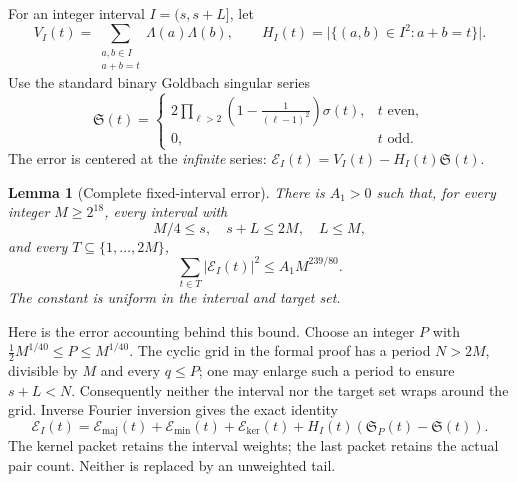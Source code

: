 \documentclass[11pt]{article}
\newtheorem{lemma}[theorem]{Lemma}
\theoremstyle{definition}
\theoremstyle{remark}
\newcommand{\sig}{\sigma}
\newcommand{\card}[1]{\lvert #1\rvert}
\begin{document}
For an integer interval \(I=(s,s+L]\), let
\[
 V_I(t)=\sum_{\substack{a,b\in I\\a+b=t}}\Lambda(a)\Lambda(b),
 \qquad
 H_I(t)=\card{\{(a,b)\in I^2:a+b=t\}}.
\]
Use the standard binary Goldbach singular series
\[
 \mathfrak S(t)=
 \begin{cases}
 2\displaystyle\prod_{\ell>2}\left(1-\frac1{(\ell-1)^2}\right)\sig(t),
       &t\text{ even},\\
 0,&t\text{ odd}.
 \end{cases}
\]
The error is centered at the \emph{infinite} series:
\(\mathcal E_I(t)=V_I(t)-H_I(t)\mathfrak S(t)\).

\begin{lemma}[Complete fixed-interval error]\label{lem:source-error}
There is \(A_1>0\) such that, for every integer \(M\ge2^{18}\), every
interval with
\[
 M/4\le s,\quad s+L\le2M,\quad L\le M,
\]
and every \(T\subseteq\{1,\ldots,2M\}\),
\begin{equation}\label{eq:source-error}
 \sum_{t\in T}|\mathcal E_I(t)|^2\le A_1 M^{239/80}.
\end{equation}
The constant is uniform in the interval and target set.
\end{lemma}

Here is the error accounting behind this bound. Choose an integer
\(P\) with
\(\tfrac12M^{1/40}\le P\le M^{1/40}\).
The cyclic grid in the formal proof has a period \(N>2M\), divisible
by \(M\) and every \(q\le P\); one may enlarge such a period to ensure
\(s+L<N\). Consequently neither the interval nor the target set wraps
around the grid. Inverse Fourier inversion gives the exact identity
\begin{equation}\label{eq:four}
 \mathcal E_I(t)=\mathcal E_{\mathrm{maj}}(t)
   +\mathcal E_{\mathrm{min}}(t)+\mathcal E_{\mathrm{ker}}(t)
   +H_I(t)(\mathfrak S_P(t)-\mathfrak S(t)).
\end{equation}
The kernel packet retains the interval weights; the last packet retains
the actual pair count. Neither is replaced by an unweighted tail.
\end{document}
